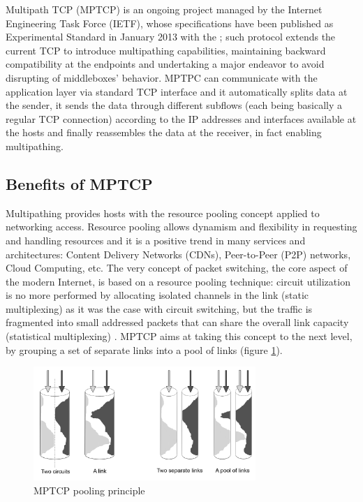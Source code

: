 Multipath TCP (MPTCP) is an ongoing project managed by the Internet Engineering Task Force (IETF), whose specifications have been published as Experimental Standard in January 2013 with the ; such protocol extends the current TCP to introduce multipathing capabilities, maintaining backward compatibility at the endpoints and undertaking a major endeavor to avoid disrupting of middleboxes' behavior. MPTPC can communicate with the application layer via standard TCP interface and it automatically splits data at the sender, it sends the data through different subflows (each being basically a regular TCP connection) according to the IP addresses and interfaces available at the hosts and finally reassembles the data at the receiver, in fact enabling multipathing.

\subsection{Benefits of MPTCP}
\label{benefits}
Multipathing provides hosts with the resource pooling concept applied to networking access. Resource pooling allows dynamism and flexibility in requesting and handling resources and it is a positive trend in many services and architectures: Content Delivery Networks (CDNs), Peer-to-Peer (P2P) networks, Cloud Computing, etc. The very concept of packet switching, the core aspect of the modern Internet, is based on a resource pooling technique: circuit utilization is no more performed by allocating isolated channels in the link (static multiplexing) as it was the case with circuit switching, but the traffic is fragmented into small addressed packets that can share the overall link capacity (statistical multiplexing) \cite{DBLP:journals/corr/QadirAYSC15}. MPTCP aims at taking this concept to the next level, by grouping a set of separate links into a pool of links (figure \ref{fig:pooling}). 


\begin{figure}[!htb]
\centering
\includegraphics[width=0.75\textwidth]{images/pooling}
\caption{MPTCP pooling principle}
\label{fig:pooling}
\end{figure}


